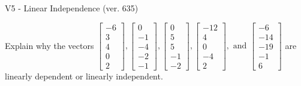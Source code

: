 \begin{exercise}
  \begin{exerciseTitle}V5 - Linear Independence (ver. 635)\end{exerciseTitle}
  \begin{exerciseStatement}
    Explain why the vectors \(\left[\begin{array}{r}
-6 \\
3 \\
4 \\
0 \\
2
\end{array}\right] , \left[\begin{array}{r}
0 \\
-1 \\
-4 \\
-2 \\
-1
\end{array}\right] , \left[\begin{array}{r}
0 \\
5 \\
5 \\
-1 \\
-2
\end{array}\right] , \left[\begin{array}{r}
-12 \\
4 \\
0 \\
-4 \\
2
\end{array}\right] , \text{ and } \left[\begin{array}{r}
-6 \\
-14 \\
-19 \\
-1 \\
6
\end{array}\right]\) are linearly dependent or linearly independent.	



\end{exerciseStatement}
\end{exercise}

